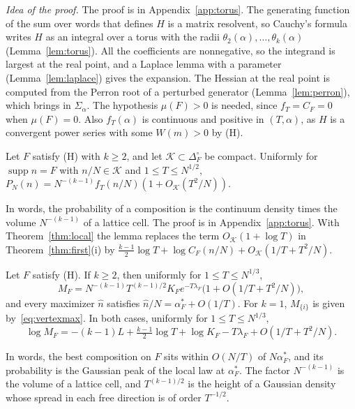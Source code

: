 \emph{Idea of the proof.} The proof is in Appendix~\ref{app:torus}. The
generating function of the sum over words that defines $H$ is a matrix resolvent, so
Cauchy's formula writes $H$ as an integral over a torus with the radii
$\theta_2(\alpha),\dots,\theta_k(\alpha)$ (Lemma~\ref{lem:torus}).
All the coefficients are nonnegative, so the integrand is largest at the real
point, and a Laplace lemma with a parameter (Lemma~\ref{lem:laplace}) gives the
expansion. The Hessian at the real point is computed from the Perron root of a
perturbed generator (Lemma~\ref{lem:perron}), which brings in $\Sigma_\alpha$.
The hypothesis $\mu(F)>0$ is needed, since $f_T=C_F=0$ when
$\mu(F)=0$. Also $f_T(\alpha)$ is continuous and positive in $(T,\alpha)$, as
$H$ is a convergent power series with some $W(m)>0$ by (H).

\begin{lemma}\label{lem:discrete}
Let $F$ satisfy (H) with $k\ge2$, and let $\mathcal K\subset\Delta_F^\circ$ be
compact. Uniformly for $\operatorname{supp}n=F$ with $n/N\in\mathcal K$ and
$1\le T\le N^{1/2}$,
$P_N(n)=N^{-(k-1)}f_T(n/N)(1+O_{\mathcal K}(T^2/N))$.
\end{lemma}

In words, the probability of a composition is the continuum density times the volume
$N^{-(k-1)}$ of a lattice cell. The proof is in Appendix~\ref{app:torus}. With
Theorem~\ref{thm:local} the lemma replaces the term $O_{\mathcal K}(1+\log T)$ in
Theorem~\ref{thm:first}(i) by $\frac{k-1}2\log T+\log C_F(n/N)+O_{\mathcal K}(1/T+T^2/N)$.

\begin{theorem}\label{thm:facemax}
Let $F$ satisfy (H). If $k\ge2$, then uniformly for $1\le T\le N^{1/3}$,
\[
M_F=N^{-(k-1)}T^{(k-1)/2}K_Fe^{-T\lambda_F}\bigl(1+O(1/T+T^2/N)\bigr),
\]
and every maximizer $\hat n$ satisfies $\hat n/N=\alpha^*_F+O(1/T)$. For $k=1$,
$M_{\{i\}}$ is given by~\eqref{eq:vertexmax}. In both cases,
uniformly for $1\le T\le N^{1/3}$,
\begin{equation}\label{eq:logmax}
\log M_F=-(k-1)L+\tfrac{k-1}2\log T+\log K_F-T\lambda_F+O(1/T+T^2/N).
\end{equation}
\end{theorem}

In words, the best composition on $F$ sits within $O(N/T)$ of $N\alpha^*_F$,
and its probability is the Gaussian peak of the local law at $\alpha^*_F$. The
factor $N^{-(k-1)}$ is the volume of a lattice cell, and $T^{(k-1)/2}$ is the
height of a Gaussian density whose spread in each free direction is of order
$T^{-1/2}$.

